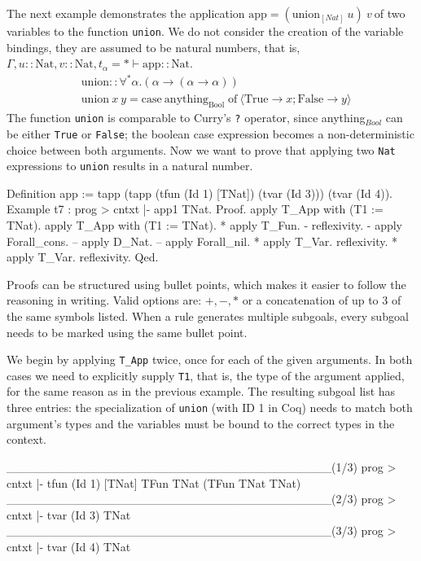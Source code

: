 \documentclass[fleqn]{scrreprt}
\newcommand{\todo}[1]{\marginpar{\textbf{TODO:} #1}}
\newcommand{\coqinline}[1]{\texttt{#1}}
\begin{document}
The next example demonstrates the application $\text{app} = (\text{union}_{[Nat]} \: u) \: v \:$of two variables to the function \texttt{union}. We do not consider the creation of the variable bindings, they are assumed to be natural numbers, that is, $\Gamma, u :: \text{Nat}, v :: \text{Nat}, t_{\alpha} = * \vdash \text{app} :: \text{Nat}$.
\begin{align*}
&\text{union}::\forall^{*}\alpha.(\alpha \rightarrow (\alpha \rightarrow \alpha))\\
&\text{union}\: x \: y = \text{case}\: \text{anything}_{\text{Bool}} \; \text{of}\: \langle \text{True} \rightarrow x; \text{False} \rightarrow y\rangle
\end{align*}
The function \texttt{union} is comparable to Curry's \texttt{?} operator, since anything$_{Bool}$ can be either \texttt{True} or \texttt{False}; the boolean case expression becomes a non-deterministic choice between both arguments. Now we want to prove that applying two \texttt{Nat} expressions to \texttt{union} results in a natural number.
\begin{coqcode}
Definition app := tapp (tapp (tfun (Id 1) [TNat])
                             (tvar (Id 3)))
                       (tvar (Id 4)).    
Example t7 : prog > cntxt |- app1 \in TNat.              
Proof.
 apply T_App with (T1 := TNat). apply T_App with (T1 := TNat).
   * apply T_Fun.
     - reflexivity.
     - apply Forall_cons.
       -- apply D_Nat.
       -- apply Forall_nil.
   * apply T_Var. reflexivity.
   * apply T_Var. reflexivity.
Qed.
\end{coqcode}
Proofs can be structured using bullet points, which makes it easier to follow the reasoning in writing. Valid options are: $+, -, *$ or a concatenation of up to 3 of the same symbols listed. When a rule generates multiple subgoals, every subgoal needs to be marked using the same bullet point. \todo{Am Anfang einführen?}
\par
We begin by applying \coqinline{T_App} twice, once for each of the given arguments. In both cases we need to explicitly supply \coqinline{T1}, that is, the type of the argument applied, for the same reason as in the previous example. The resulting subgoal list has three entries: the specialization of \texttt{union} (with ID 1 in Coq) needs to match both argument's types and the variables must be bound to the correct types in the context. 
\begin{coqcode}
______________________________________(1/3)
prog > cntxt |- tfun (Id 1) [TNat] \in TFun TNat (TFun TNat TNat)
______________________________________(2/3)
prog > cntxt |- tvar (Id 3) \in TNat
______________________________________(3/3)
prog > cntxt |- tvar (Id 4) \in TNat
\end{coqcode}
\end{document}
